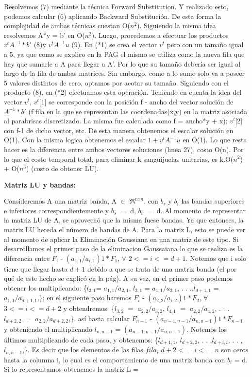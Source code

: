 \documentclass[a4paper]{article}
\begin{document}
Resolvemos (7) mediante la técnica Forward Substitution. Y realizado esto, podemos calcular (6) aplicando Backward Substitución. De esta forma la complejidad de ambas técnicas cuestan O($n^2$). Siguiendo la misma idea resolvemos 
A*y = b' en O($n^2$). Luego, procedemos a efectuar los productos $v^t A^{-1}*b'$ (8)y $v^t A^{-1}u$ (9). En (*1) se crea el vector $v^t$ pero con un tamaño igual a 5, ya que como se explico en la PAG el mismo  se utiliza como la nueva fila que hay que sumarle a A para llegar a A'. Por lo que su tamaño debería ser igual al largo de la fila de ambas matrices. Sin embargo, como a lo sumo solo va a poseer 5 valores distintos de cero, optamos por acotar su tamaño. Siguiendo con el producto (8), en (*2) efectuamos esta operación. Teniendo en cuenta la idea del vector $v^t$, $v^t$[1] se corresponde con la posición f - ancho del vector solución de $A^{-1}*b'$ (f fila en la que se representan las coordenadas(x,y) en la matriz asociada al parabrisas discretizado. La misma fue calculada como f = ancho*y + x); $v^t$[2] con f-1 de dicho vector, etc. De esta manera obtenemos el escalar solución en O(1). Con la misma logica obtenemos el escalar $1+v^t A^{-1}u$ en O(1). Lo que resta hacer es la diferencia entre ambos vectores soluciones (linea 27), costo O(n). Por lo que el costo temporal total, para eliminar k sanguijuelas unitarias, es k.O($n^2$) + O($n^3$) (costo de obtener LU).\newline\newline

\textbf{Matriz LU y bandas:}

Consideremos A una matriz banda, A $\in$ $\Re^{nxn}$, con $b_s$ y $b_i$ las bandas superiores e inferiores correspondientemente y $b_s$ $=$ d, $b_i$ $=$ d.\newline
Al momento de representar la matriz LU de A, se aprovechó que la misma fuese bandas. Ya que entonces, la matriz LU hereda el número de bandas de A. Para la matriz L, esto se puede ver al momento de aplicar la Eliminación Gaussiana en una matriz de este tipo. Si desarrollamos el primer paso de la eliminacion Gaussaiana lo que se  realiza es la diferencia entre $F_i$ - $(a_{1,1}/a_{i,1})1*F_1$, $\forall$ $2 <= i <= d+1$. Notemos que i solo tiene que llegar hasta $d+1$ debido a que se trata de una matriz banda (el por qué de este hecho se explicó en la pág). A su vez, en el primer paso podemos obtener los multiplicando:  \{$l_{2,1}$= $a_{1,1}/a_{2,1}$, $l_{3,1}$ = $a_{1,1}/a_{3,1}$, . . .,$l_{d+1,1}$ = $a_{1,1}/a_{d+1,1}$,\}; en el siguiente paso haremos  $F_i$ - $(a_{2,2}/a_{i,2})1*F_2$, $\forall$ $3 <= i <= d+2$ y obtendremos: \{$l_{3,2}$ $=$ $a_{2,2}/a_{3,2}$, $l_{4,1}$ $=$ $a_{2,2}/a_{4,2}$, . . . $l_{d+2,2}$ $=$ $a_{2,2}/a_{d+2,2}$,\}, así hasta calcular $F_{n-1}$ - $(a_{n-1,n-1}/a_{n,n-1})1*F_{n-1}$ y obteniendo el multiplicando $l_{n,n-1}$ = $(a_{n-1,n-1}/a_{n,n-1})$.  Notemos los últimos multiplicando de cada paso, y obtenemos: \{$l_{d+1,1}$, $l_{d+2,2}$, . . ,$l_{d+i,i}$, . . ,$l_{n,n-1}$,\}. Es decir que los elementos de las filas $fila_i$ $d+2<= i <= n$ son ceros hasta la columna i, lo cual es el comportamiento de una matriz banda con $b_i$ = d. Si lo representamos obtenemos la matriz L = 
\end{document}
